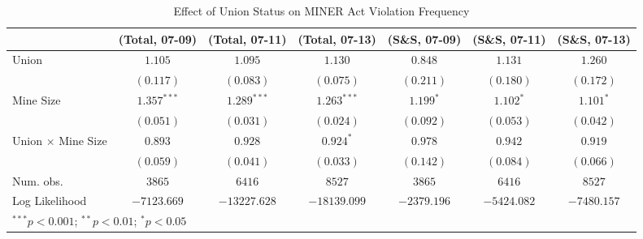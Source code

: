 
\begin{table}[H]
\begin{center}
\begin{tabular}{l c c c c c c}
\hline
 & (Total, 07-09) & (Total, 07-11) & (Total, 07-13) & (S\&S, 07-09) & (S\&S, 07-11) & (S\&S, 07-13) \\
\hline
Union                      & $1.105$       & $1.095$       & $1.130$       & $0.848$     & $1.131$     & $1.260$     \\
                           & $(0.117)$     & $(0.083)$     & $(0.075)$     & $(0.211)$   & $(0.180)$   & $(0.172)$   \\
Mine Size                  & $1.357^{***}$ & $1.289^{***}$ & $1.263^{***}$ & $1.199^{*}$ & $1.102^{*}$ & $1.101^{*}$ \\
                           & $(0.051)$     & $(0.031)$     & $(0.024)$     & $(0.092)$   & $(0.053)$   & $(0.042)$   \\
Union $ \times $ Mine Size & $0.893$       & $0.928$       & $0.924^{*}$   & $0.978$     & $0.942$     & $0.919$     \\
                           & $(0.059)$     & $(0.041)$     & $(0.033)$     & $(0.142)$   & $(0.084)$   & $(0.066)$   \\
\hline
Num. obs.                  & $3865$        & $6416$        & $8527$        & $3865$      & $6416$      & $8527$      \\
Log Likelihood             & $-7123.669$   & $-13227.628$  & $-18139.099$  & $-2379.196$ & $-5424.082$ & $-7480.157$ \\
\hline
\multicolumn{7}{l}{\scriptsize{$^{***}p<0.001$; $^{**}p<0.01$; $^{*}p<0.05$}}
\end{tabular}
\caption{Effect of Union Status on MINER Act Violation Frequency}
\label{irr_100employees_mineract_violations}
\end{center}
\end{table}

